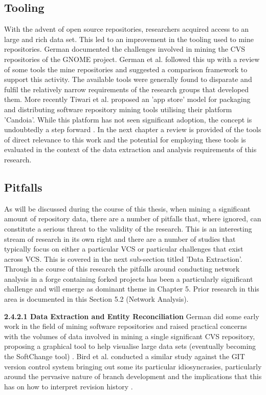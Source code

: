 \subsection{Tooling}
With the advent of open source repositories, researchers acquired access to an large and rich data set. This led to an improvement in the tooling used to mine repositories. German \citep{german2004mining} documented the challenges involved in mining the CVS repositories of the GNOME project. German et al. \citep{german2005framework} followed this up with a review of some tools the mine repositories and suggested a comparison framework to support this activity. The available tools were generally found to disparate and fulfil the relatively narrow requirements of the research groups that developed them. More recently Tiwari et al. proposed an 'app store' model for packaging and distributing software repository mining tools utilising their platform 'Candoia'. While this platform has not seen significant adoption, the concept is undoubtedly a step forward \citep{tiwari2017candoia}. In the next chapter a review is provided of the tools of direct relevance to this work and the potential for employing these tools is evaluated in the context of the data extraction and analysis requirements of this research. 

\subsection{Pitfalls}
As will be discussed during the course of this thesis, when mining a significant amount of repository data, there are a number of pitfalls that, where ignored, can constitute a serious threat to the validity of the research. This is an interesting stream of research in its own right and there are a number of studies that typically focus on either a particular VCS or particular challenges that exist across VCS. This is covered  in the next sub-section titled 'Data Extraction'. Through the course of this research the pitfalls around conducting network analysis in a forge containing forked projects has been a particularly significant challenge and will emerge as dominant theme in Chapter 5. Prior research in this area is documented in this Section 5.2 (Network Analysis).

\newline
\textbf{2.4.2.1 Data Extraction and Entity Reconciliation}
\newline
German did some early work in the field of mining software repositories and raised practical concerns with the volumes of data involved in mining a single significant CVS repository, proposing a graphical tool to help visualise large data sets (eventually becoming the SoftChange tool) \citep{german2004mining}. Bird et al. conducted a similar study against the GIT version control system bringing out some its particular idiosyncrasies, particularly around the pervasive nature of branch development and the implications that this has on how to interpret revision history \citep{bird2009promises}.

